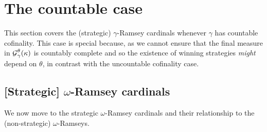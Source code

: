\documentclass[../../main]{subfiles}
\begin{document}
\section{The countable case}

This section covers the (strategic) $\gamma$-Ramsey cardinals whenever $\gamma$ has countable cofinality. This case is special because, as we cannot ensure that the final measure in $\operatorname{\mathcal G}_\gamma^\theta(\kappa)$ is countably complete and so the existence of winning strategies \textit{might} depend on $\theta$, in contrast with the uncountable cofinality case.

\subsection{[Strategic] $\omega$-Ramsey cardinals}

We now move to the strategic $\omega$-Ramsey cardinals and their relationship to the (non-strategic) $\omega$-Ramseys. 
\end{document}
